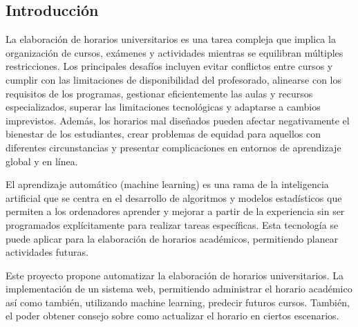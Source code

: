\subsection{Introducción}

La elaboración de horarios universitarios es una tarea compleja que implica la organización de cursos, exámenes y actividades mientras se equilibran múltiples restricciones.
Los principales desafíos incluyen evitar conflictos entre cursos y cumplir con las limitaciones de disponibilidad del profesorado, alinearse con los requisitos de los programas, gestionar eficientemente las aulas y recursos especializados, superar las limitaciones tecnológicas y adaptarse a cambios imprevistos.
Además, los horarios mal diseñados pueden afectar negativamente el bienestar de los estudiantes, crear problemas de equidad para aquellos con diferentes circunstancias y presentar complicaciones en entornos de aprendizaje global y en línea.

El aprendizaje automático (machine learning) es una rama de la inteligencia artificial que se centra en el desarrollo de algoritmos y modelos estadísticos que permiten a los ordenadores aprender y mejorar a partir de la experiencia sin ser programados explícitamente para realizar tareas específicas.
Esta tecnología se puede aplicar para la elaboración de horarios académicos, permitiendo planear actividades futuras.

Este proyecto propone automatizar la elaboración de horarios universitarios. 
La implementación de un sistema web, permitiendo administrar el horario académico así como también, utilizando machine learning, predecir futuros cursos.
También, el poder obtener consejo sobre como actualizar el horario en ciertos escenarios.